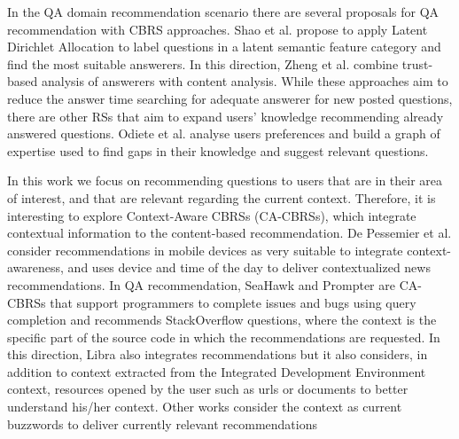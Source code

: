 \documentclass[preprint]{elsarticle}
\begin{document}
\begin{spacing}{1.5}
In the QA domain recommendation scenario there are several proposals for QA recommendation with CBRS approaches. Shao et al.\cite{Shao2017} propose to apply Latent Dirichlet Allocation to label questions in a latent semantic feature category and find the most suitable answerers. In this direction, Zheng et al. \cite{Zheng2015b} combine trust-based analysis of answerers with content analysis. While these approaches aim to reduce the answer time searching for adequate answerer for new posted questions, there are other RSs that aim to expand users' knowledge recommending already answered questions. Odiete et al. \cite{Odiete2017} analyse users preferences and build a graph of expertise used to find gaps in their knowledge and suggest relevant questions.



In this work we focus on recommending questions to users that are in their area of interest, and that are relevant regarding the current context. Therefore, it is interesting to explore Context-Aware CBRSs (CA-CBRSs), which integrate contextual information to the content-based recommendation. De Pessemier et al. \cite{DePessemier2016} consider recommendations in mobile devices as very suitable to integrate context-awareness, and uses device and time of the day to deliver contextualized news recommendations. In QA recommendation, SeaHawk \cite{Ponzanelli2014} and Prompter \cite{Ponzanelli2014b} are CA-CBRSs that support programmers to complete issues and bugs using query completion and recommends StackOverflow questions, where the context is the specific part of the source code in which the recommendations are requested. In this direction, Libra \cite{Ponzanelli2017} also integrates recommendations but it also considers, in addition to context extracted from the Integrated Development Environment context, resources opened by the user such as urls or documents to better understand his/her context. Other works consider the context as current buzzwords to deliver currently relevant recommendations \cite{Parikh2009}


\end{spacing}
\end{document}
